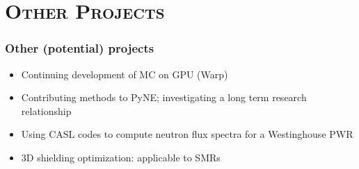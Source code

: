 \documentclass[xcolor=x11names,compress]{beamer}
\renewcommand{\(}{\begin{columns}}
\renewcommand{\)}{\end{columns}}
\newcommand{\<}[1]{\begin{column}{#1}}
\renewcommand{\>}{\end{column}}
\begin{document}
\section{\scshape Other Projects}
\begin{frame}[fragile]
  \frametitle{Other (potential) projects}

  	\begin{itemize}
  	\item Continuing development of MC on GPU (Warp)
  	\item Contributing methods to PyNE; investigating a long term research relationship 
	\item Using CASL codes to compute neutron flux spectra for a Westinghouse PWR 
	\item 3D shielding optimization: applicable to SMRs 
	\end{itemize}
	
\end{frame}
\end{document}

